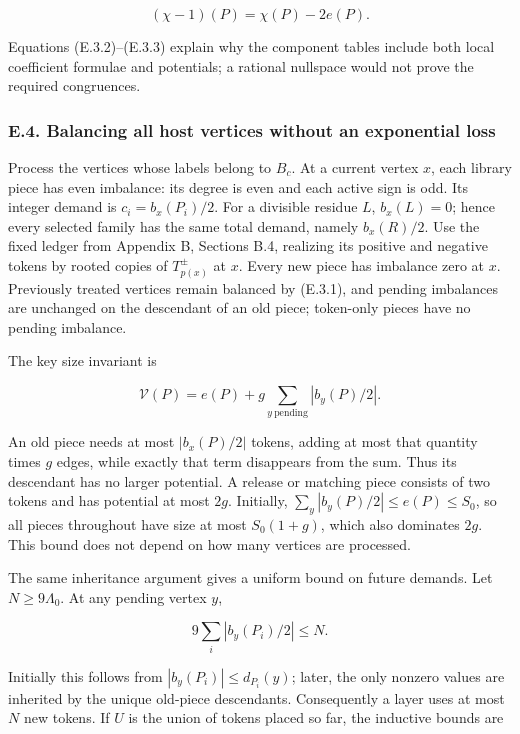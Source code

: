 \documentclass[english,11pt,a4paper]{article}
\begin{document}
\[(\chi-1)(P)=\chi(P)-2e(P).
\tag{E.3.3}\]

Equations (E.3.2)--(E.3.3) explain why the component tables include both local coefficient formulae and potentials; a rational nullspace would not prove the required congruences.

\subsubsection{E.4. Balancing all host vertices without an exponential loss}\label{e.4.-balancing-all-host-vertices-without-an-exponential-loss}

Process the vertices whose labels belong to \(B_c\). At a current vertex \(x\), each library piece has even imbalance: its degree is even and each active sign is odd. Its integer demand is \(c_i=b_x(P_i)/2\). For a divisible residue \(L\), \(b_x(L)=0\); hence every selected family has the same total demand, namely \(b_x(R)/2\). Use the fixed ledger from Appendix B, Sections B.4, realizing its positive and negative tokens by rooted copies of \(T_{p(x)}^\pm\) at \(x\). Every new piece has imbalance zero at \(x\). Previously treated vertices remain balanced by (E.3.1), and pending imbalances are unchanged on the descendant of an old piece; token-only pieces have no pending imbalance.

The key size invariant is

\[\mathcal V(P)=e(P)+g\sum_{y\ \mathrm{pending}}|b_y(P)/2|.
\tag{E.4.1}\]

An old piece needs at most \(|b_x(P)/2|\) tokens, adding at most that quantity times \(g\) edges, while exactly that term disappears from the sum. Thus its descendant has no larger potential. A release or matching piece consists of two tokens and has potential at most \(2g\). Initially, \(\sum_y|b_y(P)/2|\le e(P)\le S_0\), so all pieces throughout have size at most \(S_0(1+g)\), which also dominates \(2g\). This bound does not depend on how many vertices are processed.

The same inheritance argument gives a uniform bound on future demands. Let \(N\ge9\Lambda_0\). At any pending vertex \(y\),

\[9\sum_i|b_y(P_i)/2|\le N.
\tag{E.4.2}\]

Initially this follows from \(|b_y(P_i)|\le d_{P_i}(y)\); later, the only nonzero values are inherited by the unique old-piece descendants. Consequently a layer uses at most \(N\) new tokens. If \(U\) is the union of tokens placed so far, the inductive bounds are
\end{document}
